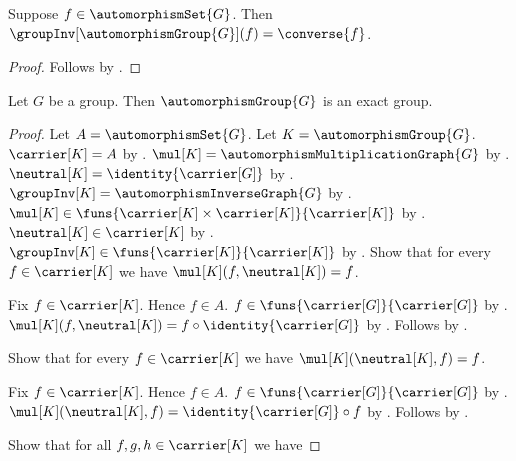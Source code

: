 \begin{proposition}\label{automorphism_group_inv_apply}
    Suppose $f\in\automorphismSet{G}$.
    Then $\groupInv[\automorphismGroup{G}](f)=\converse{f}$.
\end{proposition}
\begin{proof}
    Follows by
        .
\end{proof}

\begin{theorem}\label{automorphism_group_is_exact_group}
    Let $G$ be a group.
    Then $\automorphismGroup{G}$ is an exact group.
\end{theorem}
\begin{proof}
    Let $A=\automorphismSet{G}$.
    Let $K=\automorphismGroup{G}$.
    $\carrier[K]=A$ by .
    $\mul[K]=\automorphismMultiplicationGraph{G}$ by
        .
    $\neutral[K]=\identity{\carrier[G]}$ by
        .
    $\groupInv[K]=\automorphismInverseGraph{G}$ by
        .
    $\mul[K]\in\funs{\carrier[K]\times\carrier[K]}{\carrier[K]}$ by
        .
    $\neutral[K]\in\carrier[K]$ by
        .
    $\groupInv[K]\in\funs{\carrier[K]}{\carrier[K]}$ by
        .
    Show that for every $f\in\carrier[K]$ we have
        $\mul[K](f,\neutral[K])=f$.
    \begin{subproof}
        Fix $f\in\carrier[K]$.
        Hence $f\in A$.
        $f\in\funs{\carrier[G]}{\carrier[G]}$ by
            .
        $\mul[K](f,\neutral[K])=
            f\circ\identity{\carrier[G]}$ by
            .
        Follows by .
    \end{subproof}
    Show that for every $f\in\carrier[K]$ we have
        $\mul[K](\neutral[K],f)=f$.
    \begin{subproof}
        Fix $f\in\carrier[K]$.
        Hence $f\in A$.
        $f\in\funs{\carrier[G]}{\carrier[G]}$ by
            .
        $\mul[K](\neutral[K],f)=
            \identity{\carrier[G]}\circ f$ by
            .
        Follows by .
    \end{subproof}
    Show that for all $f,g,h\in\carrier[K]$ we have

\end{proof}
